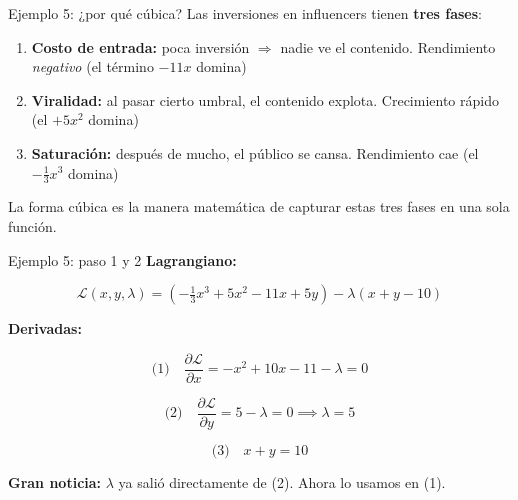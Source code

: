 \documentclass{beamer}
\begin{document}
\begin{frame}{Ejemplo 5: ¿por qué cúbica?}
    \small
    Las inversiones en influencers tienen \textbf{tres fases}:

    \vspace{0.5em}

    \begin{enumerate}
        \item \textbf{Costo de entrada:} poca inversión $\Rightarrow$ nadie ve el contenido. Rendimiento \textit{negativo} (el término $-11x$ domina)
        \item \textbf{Viralidad:} al pasar cierto umbral, el contenido explota. Crecimiento rápido (el $+5x^2$ domina)
        \item \textbf{Saturación:} después de mucho, el público se cansa. Rendimiento cae (el $-\frac{1}{3}x^3$ domina)
    \end{enumerate}

    \vspace{0.5em}

    La forma cúbica es la manera matemática de capturar estas tres fases en una sola función.
\end{frame}

\begin{frame}{Ejemplo 5: paso 1 y 2}
    \small
    \textbf{Lagrangiano:}

    \[
    \mathcal{L}(x, y, \lambda) = \left(-\tfrac{1}{3}x^3 + 5x^2 - 11x + 5y\right) - \lambda(x + y - 10)
    \]

    \vspace{0.5em}

    \textbf{Derivadas:}

    \[
    \text{(1)} \quad \frac{\partial \mathcal{L}}{\partial x} = -x^2 + 10x - 11 - \lambda = 0
    \]

    \[
    \text{(2)} \quad \frac{\partial \mathcal{L}}{\partial y} = 5 - \lambda = 0 \implies \boxed{\lambda = 5}
    \]

    \[
    \text{(3)} \quad x + y = 10
    \]

    \vspace{0.3em}

    \textbf{Gran noticia:} $\lambda$ ya salió directamente de (2). Ahora lo usamos en (1).
\end{frame}
\end{document}
